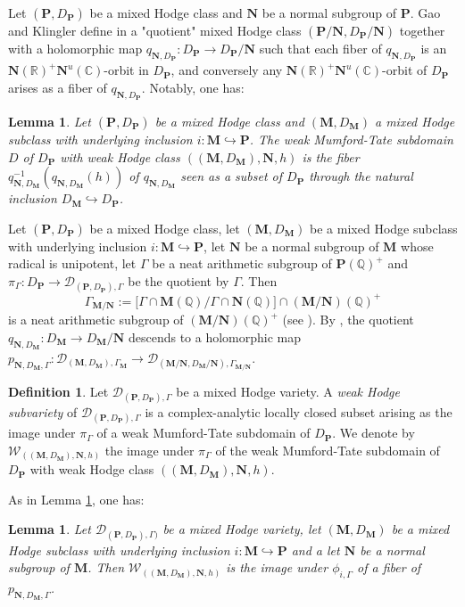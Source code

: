 \documentclass[10pt]{article}
\numberwithin{equation}{subsection}
\theoremstyle{plain}
\newtheorem{lemma}[theorem]{Lemma}
\theoremstyle{definition}
\newtheorem{definition}[theorem]{Definition}
\theoremstyle{remark}
\newcommand{\Q}{\mathbb Q}
\newcommand{\C}{\mathbb C}
\newcommand{\R}{\mathbb R}
\newcommand{\pp}{\mathbf P}
\newcommand{\M}{\mathbf M}
\newcommand{\NN}{\mathbf N}
\newcommand{\period}{\mathscr{D}}
\begin{document}
Let $(\pp, D_\pp)$ be a mixed Hodge class and $\NN$ be a normal subgroup of $\pp$. Gao and Klingler define in \cite[Prop. 5.1]{klingao} a "quotient" mixed Hodge class $(\pp/\NN, D_\pp/\NN)$ together with a holomorphic map $q_{\NN, D_\pp} : D_\pp \rightarrow D_\pp/\NN$ such that each fiber of $q_{\NN, D_\pp}$ is an $\NN(\R)^+\NN^u(\C)$-orbit in $D_\pp$, and conversely any $\NN(\R)^+\NN^u(\C)$-orbit of $D_\pp$ arises as a fiber of $q_{\NN, D_\pp}$. Notably, one has:
\begin{lemma}\label{weakmtcar}
Let $(\pp, D_\pp)$ be a mixed Hodge class and $(\M, D_\M)$ a mixed Hodge subclass with underlying inclusion $i : \M \hookrightarrow \pp$. The weak Mumford-Tate subdomain $D$ of $D_\pp$ with weak Hodge class $((\M,D_\M),\NN,h)$ is the fiber $q_{\NN, D_\M}^{-1}(q_{\NN, D_\M}(h))$ of $q_{\NN, D_\M}$ seen as a subset of $D_\pp$ through the natural inclusion $D_\M \hookrightarrow D_\pp$.
\end{lemma}
Let $(\pp, D_\pp)$ be a mixed Hodge class, let $(\M, D_\M)$ be a mixed Hodge subclass with underlying inclusion $i : \M \hookrightarrow \pp$, let $\NN$ be a normal subgroup of $\M$ whose radical is unipotent, let $\Gamma$ be a neat arithmetic subgroup of $\pp(\Q)^+$ and $\pi_\Gamma : D_\pp \rightarrow \period_{(\pp, D_\pp), \Gamma}$ be the quotient by $\Gamma$. Then \[\Gamma_{\M/\NN} := \Big[\Gamma \cap \M(\Q)/\Gamma \cap \NN(\Q)\Big] \cap (\M/\NN)(\Q)^+\] is a neat arithmetic subgroup of  $(\M/\NN)(\Q)^+$ (see \cite[Chap. III, \S 7]{amrt}). By \cite{klingao}, the quotient $q_{\NN, D_\M} : D_\M \rightarrow D_\M/\NN$ descends to a holomorphic map $p_{\NN, D_\M, \Gamma} : \period_{(\M,D_\M), \Gamma_\M} \rightarrow \period_{(\M/\NN, D_\M/\NN), \Gamma_{\M/\NN}}$.
\begin{definition}
Let $\period_{(\pp, D_\pp), \Gamma}$ be a mixed Hodge variety. A \textit{weak Hodge subvariety} of $\period_{(\pp, D_\pp), \Gamma}$ is a complex-analytic locally closed subset arising as the image under $\pi_\Gamma$ of a weak Mumford-Tate subdomain of $D_\pp$. We denote by $\mathscr{W}_{((\M, D_\M), \NN, h)}$ the image under $\pi_\Gamma$ of the weak Mumford-Tate subdomain of $D_\pp$ with weak Hodge class $((\M, D_\M), \NN, h)$.
\end{definition}
As in Lemma \ref{weakmtcar}, one has:
\begin{lemma}
Let $\period_{(\pp, D_\pp), \Gamma)}$ be a mixed Hodge variety, let $(\M, D_\M)$ be a mixed Hodge subclass with underlying inclusion $i : \M \hookrightarrow \pp$ and a let $\NN$ be a normal subgroup of $\M$. Then $\mathscr{W}_{((\M, D_\M), \NN, h)}$ is the image under $\phi_{i, \Gamma}$ of a fiber of $p_{\NN, D_\M, \Gamma}$.
\end{lemma}
\end{document}

